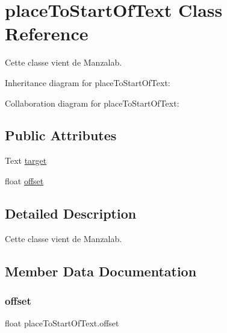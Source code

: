 \hypertarget{classplace_to_start_of_text}{}\section{place\+To\+Start\+Of\+Text Class Reference}
\label{classplace_to_start_of_text}


Cette classe vient de Manzalab.  




Inheritance diagram for place\+To\+Start\+Of\+Text\+:


Collaboration diagram for place\+To\+Start\+Of\+Text\+:
\subsection*{Public Attributes}
\begin{DoxyCompactItemize}
\item 
Text \hyperlink{classplace_to_start_of_text_aa7ed5e65b481389bcc995fc67819e5d3}{target}
\item 
float \hyperlink{classplace_to_start_of_text_a3efa83f3799919de62fc979ed54f3fb3}{offset}
\end{DoxyCompactItemize}


\subsection{Detailed Description}
Cette classe vient de Manzalab. 



\subsection{Member Data Documentation}
\mbox{\label{classplace_to_start_of_text_a3efa83f3799919de62fc979ed54f3fb3}} 
\subsubsection{\texorpdfstring{offset}{offset}}
{\footnotesize\ttfamily float place\+To\+Start\+Of\+Text.\+offset}

\mbox{\label{classplace_to_start_of_text_aa7ed5e65b481389bcc995fc67819e5d3}} 

